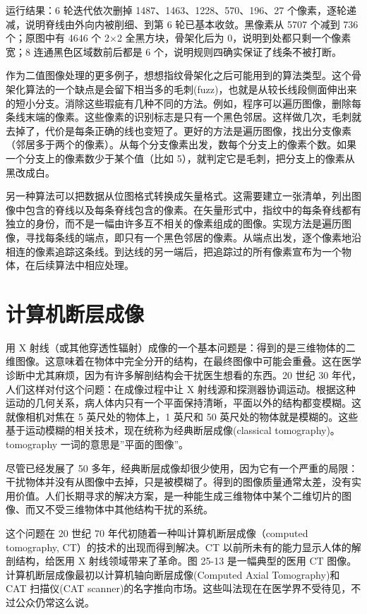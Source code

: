运行结果：6 轮迭代依次删掉 1487、1463、1228、570、196、27
个像素，逐轮递减，说明脊线由外向内被削细、到第 6 轮已基本收敛。黑像素从
5707 个减到 736 个；原图中有 4646 个 2×2 全黑方块，骨架化后为
0，说明到处都只剩一个像素宽；8 连通黑色区域数前后都是 6
个，说明规则四确实保证了线条不被打断。

作为二值图像处理的更多例子，想想指纹骨架化之后可能用到的算法类型。这个骨架化算法的一个缺点是会留下相当多的毛刺(fuzz)，也就是从较长线段侧面伸出来的短小分支。消除这些瑕疵有几种不同的方法。例如，程序可以遍历图像，删除每条线末端的像素。这些像素的识别标志是只有一个黑色邻居。这样做几次，毛刺就去掉了，代价是每条正确的线也变短了。更好的方法是遍历图像，找出分支像素（邻居多于两个的像素）。从每个分支像素出发，数每个分支上的像素个数。如果一个分支上的像素数少于某个值（比如
5），就判定它是毛刺，把分支上的像素从黑改成白。

另一种算法可以把数据从位图格式转换成矢量格式。这需要建立一张清单，列出图像中包含的脊线以及每条脊线包含的像素。在矢量形式中，指纹中的每条脊线都有独立的身份，而不是一幅由许多互不相关的像素组成的图像。实现方法是遍历图像，寻找每条线的端点，即只有一个黑色邻居的像素。从端点出发，逐个像素地沿相连的像素追踪这条线。到达线的另一端后，把追踪过的所有像素宣布为一个物体，在后续算法中相应处理。

\section{计算机断层成像}

用 X
射线（或其他穿透性辐射）成像的一个基本问题是：得到的是三维物体的二维图像。这意味着在物体中完全分开的结构，在最终图像中可能会重叠。这在医学诊断中尤其麻烦，因为有许多解剖结构会干扰医生想看的东西。20
世纪 30 年代，人们这样对付这个问题：在成像过程中让 X
射线源和探测器协调运动。根据这种运动的几何关系，病人体内只有一个平面保持清晰，平面以外的结构都变模糊。这就像相机对焦在
5 英尺处的物体上，1 英尺和 50
英尺处的物体就是模糊的。这些基于运动模糊的相关技术，现在统称为经典断层成像(classical
tomography)。tomography 一词的意思是''平面的图像''。

尽管已经发展了 50
多年，经典断层成像却很少使用，因为它有一个严重的局限：干扰物体并没有从图像中去掉，只是被模糊了。得到的图像质量通常太差，没有实用价值。人们长期寻求的解决方案，是一种能生成三维物体中某个二维切片的图像、而又不受三维物体中其他结构干扰的系统。

这个问题在 20 世纪 70 年代初随着一种叫计算机断层成像（computed
tomography, CT）的技术的出现而得到解决。CT
以前所未有的能力显示人体的解剖结构，给医用 X 射线领域带来了革命。图
25-13 是一幅典型的医用 CT
图像。计算机断层成像最初以计算机轴向断层成像(Computed Axial
Tomography)和 CAT 扫描仪(CAT
scanner)的名字推向市场。这些叫法现在在医学界不受待见，不过公众仍常这么说。

